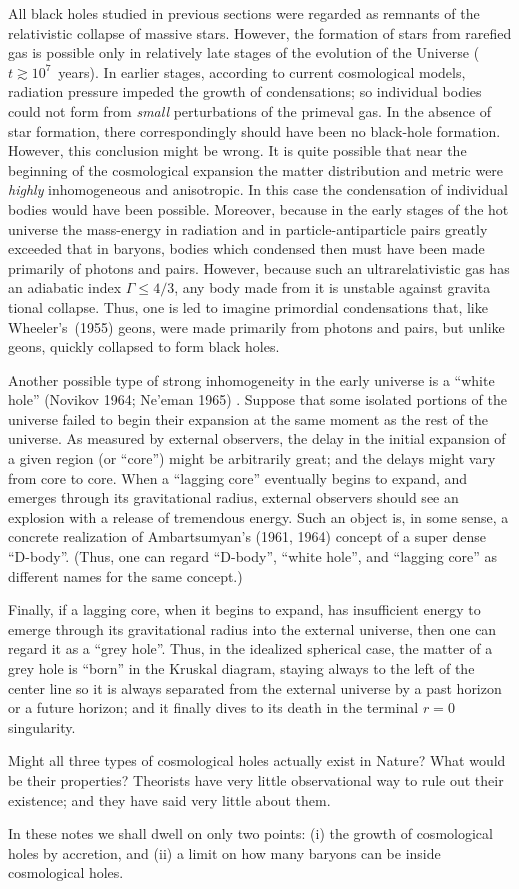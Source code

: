 All black holes studied in previous sections were regarded as remnants of the
relativistic collapse of massive stars. However, the formation of stars from rarefied
gas is possible only in relatively late stages of the evolution of the Universe
($t \gtrsim 10^7$~years). In earlier stages, according to current cosmological models,
radiation pressure impeded the growth of condensations; so individual bodies
could not form from \emph{small} perturbations of the primeval gas. In the absence of
star formation, there correspondingly should have been no black-hole formation.
However, this conclusion might be wrong. It is quite possible that near the
beginning of the cosmological expansion the matter distribution and metric were
\emph{highly} inhomogeneous and anisotropic. In this case the condensation of individual
bodies would have been possible. Moreover, because in the early stages of the hot
universe the mass-energy in radiation and in particle-antiparticle pairs greatly
exceeded that in baryons, bodies which condensed then must have been made
primarily of photons and pairs. However, because such an ultrarelativistic gas has
an adiabatic index $\Gamma \leq 4/3$, any body made from it is unstable against gravita\-
tional collapse. Thus, one is led to imagine primordial condensations that, like
Wheeler's~(1955) \cite{Wheeler1955} geons, were made primarily from photons and pairs, but unlike
geons, quickly collapsed to form black holes.

Another possible type of strong inhomogeneity in the early universe is a
``white hole'' (Novikov 1964; Ne'eman 1965) \cite{Novikov1964, Neeman1965}. Suppose that some isolated
portions of the universe failed to begin their expansion at the same moment as
the rest of the universe. As measured by external observers, the delay in the
initial expansion of a given region (or ``core'') might be arbitrarily great; and the
delays might vary from core to core. When a ``lagging core'' eventually begins to
expand, and emerges through its gravitational radius, external observers should
see an explosion with a release of tremendous energy. Such an object is, in some
sense, a concrete realization of Ambartsumyan's (1961, 1964) concept of a super\-
dense ``D-body''. (Thus, one can regard ``D-body'', ``white hole'', and ``lagging
core'' as different names for the same concept.)

Finally, if a lagging core, when it begins to expand, has insufficient energy to
emerge through its gravitational radius into the external universe, then one can
regard it as a ``grey hole''. Thus, in the idealized spherical case, the matter of a
grey hole is ``born'' in the Kruskal diagram, staying always to the left of the
center line so it is always separated from the external universe by a past horizon
or a future horizon; and it finally dives to its death in the terminal $r = 0$
singularity.

Might all three types of cosmological holes actually exist in Nature? What
would be their properties? Theorists have very little observational way to rule
out their existence; and they have said very little about them.

In these notes we shall dwell on only two points: (i) the growth of cosmological
holes by accretion, and (ii) a limit on how many baryons can be inside cosmological
holes.
